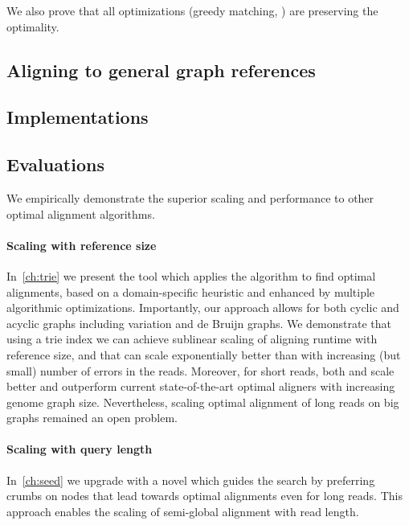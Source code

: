 We also prove that all optimizations (greedy matching, ) are preserving the optimality.



\subsection*{Aligning to general graph references}

\subsection*{Implementations}

\subsection*{Evaluations}

We empirically demonstrate the superior scaling and performance to other optimal
alignment algorithms.

\paragraph{Scaling with reference size}
In~\cref{ch:trie} we present the tool \astarix which applies the \A algorithm to
find optimal alignments, based on a domain-specific heuristic and enhanced by
multiple algorithmic optimizations. Importantly, our approach allows for both
cyclic and acyclic graphs including variation and de Bruijn graphs. We
demonstrate that using a trie index we can achieve sublinear scaling of aligning
runtime with reference size, and that \A can scale exponentially better than
\dijkstra with increasing (but small) number of errors in the reads. Moreover,
for short reads, both \astarix and \dijkstra scale better and outperform current
state-of-the-art optimal aligners with increasing genome graph size.
Nevertheless, scaling optimal alignment of long reads on big graphs remained an
open problem.

\paragraph{Scaling with query length}
In~\cref{ch:seed} we upgrade \astarix with a novel \sh which guides the \A
search by preferring crumbs on nodes that lead towards optimal alignments even
for long reads. This approach enables the scaling of semi-global alignment with
read length.

